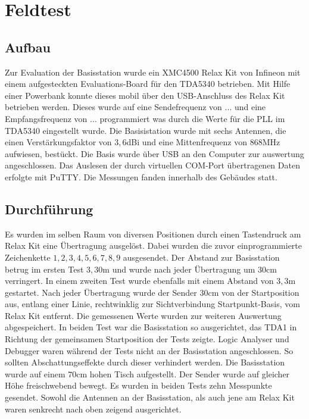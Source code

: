 \chapter{Feldtest}
\label{sec:Feldtest}
\pagestyle{scrheadings}
\section{Aufbau}
Zur Evaluation der Basisstation wurde ein  XMC4500 Relax Kit von Infineon mit einem aufgesteckten Evaluations-Board für den TDA5340 betrieben. Mit Hilfe einer Powerbank konnte dieses mobil über den \ac{USB}-Anschluss des Relax Kit betrieben werden. %
Dieses wurde auf eine Sendefrequenz von $...$ und eine Empfangsfrequenz von $...$ programmiert was durch die Werte für die \ac{PLL} im TDA5340 eingestellt wurde. 
Die Basisistation wurde mit sechs Antennen, die einen Verstärkungsfaktor von $3,6$dBi und eine Mittenfrequenz von $868$MHz aufwiesen, bestückt. Die Basis wurde über \ac{USB} an den Computer zur auswertung angeschlossen. Das Auslesen der durch virtuellen COM-Port übertragenen Daten erfolgte mit  PuTTY. Die Messungen fanden innerhalb des Gebäudes statt.
\section{Durchführung}
Es wurden  im selben Raum von diversen Positionen durch einen Tastendruck am Relax Kit eine Übertragung ausgelöst. Dabei wurden die zuvor einprogrammierte Zeichenkette $1,2,3,4,5,6,7,8,9$ ausgesendet. Der Abstand zur Basisstation betrug im ersten Test  $3,30$m und wurde nach jeder Übertragung um $30$cm verringert. 
In einem zweiten Test wurde ebenfalls mit einem Abstand von $3,3$m gestartet.  Nach jeder Übertragung wurde der Sender $30$cm  von der Startposition aus, entlang einer  Linie, rechtwinklig zur Sichtverbindung Startpunkt-Basis, vom Relax Kit entfernt. Die gemessenen Werte wurden zur weiteren Auswertung abgespeichert.
In beiden Test war die Basisstation so ausgerichtet, das TDA1 in Richtung der gemeinsamen Startposition der Tests zeigte. Logic Analyser und Debugger waren während der Tests nicht an der Basisstation angeschlossen. So sollten Abschattungseffekte durch dieser verhindert werden. Die Basisstation wurde auf einem $70$cm hohen Tisch aufgestellt. Der Sender wurde auf gleicher Höhe freischwebend bewegt. Es wurden in beiden Tests zehn Messpunkte gesendet. Sowohl die Antennen an der Basisstation, als auch jene am Relax Kit waren senkrecht nach oben zeigend ausgerichtet.
